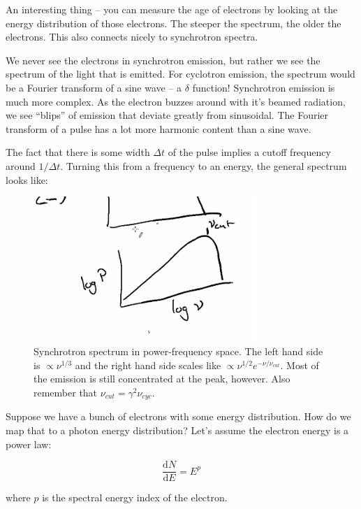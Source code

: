 \documentclass{article}
\begin{document}
An interesting thing -- you can measure the age of electrons by looking at the energy distribution of those  electrons. The steeper the spectrum, the older the electrons. This also connects nicely to synchrotron spectra.

We never see the electrons in synchrotron emission, but rather we see the spectrum of the light that is emitted. For cyclotron emission, the spectrum would be a Fourier transform of a sine wave -- a $\delta$ function! Synchrotron emission is much more complex. As the electron buzzes around with it's beamed radiation, we see ``blips'' of emission that deviate greatly from sinusoidal. The Fourier transform of a pulse has a lot more harmonic content than a sine wave. 

The fact that there is some width $\Delta t$ of the pulse implies a cutoff frequency around $1/\Delta t$. Turning this from a frequency to an energy, the general spectrum looks like:

\begin{figure}
    \centering
    \includegraphics[width=0.75\textwidth]{figures/Screen Shot 2020-11-10 at 12.06.34 PM.png}
    \caption{Synchrotron spectrum in power-frequency space. The left hand side is $\propto \nu^{1/3}$ and the right hand side scales like $\propto \nu^{1/2}e^{-\nu/\nu_{cut}}$. Most of the emission is still concentrated at the peak, however. Also remember that $\nu_{cut} = \gamma^2 \nu_{cyc}$. }
    \label{fig:syncP}
\end{figure}

Suppose we have a bunch of electrons with some energy distribution. How do we map that to a photon energy distribution? Let's assume the electron energy is a power law:

$$
\frac{\mathrm{d}N}{\mathrm{d}E} = E^{p}
$$

where $p$ is the spectral energy index of the electron.
\end{document}

